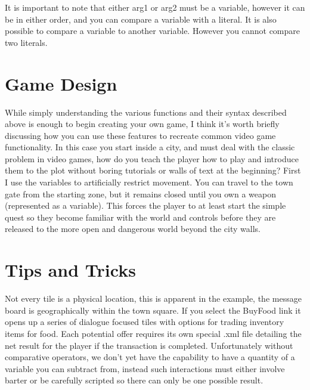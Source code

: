 \documentclass[11pt]{article}
\begin{document}
It is important to note that either arg1 or arg2 must be a variable, however it can be in either order, and you can compare a variable with a literal. It is also possible to compare a variable to another variable. However you cannot compare two literals.


\section{Game Design}

While simply understanding the various functions and their syntax described above is enough to begin creating your own game, I think it's worth briefly discussing how you can use these features to recreate common video game functionality. In this case you start inside a city, and must deal with the classic problem in video games, how do you teach the player how to play and introduce them to the plot without boring tutorials or walls of text at the beginning? First I use the variables to artificially restrict movement. You can travel to the town gate from the starting zone, but it remains closed until you own a weapon (represented as a variable). This forces the player to at least start the simple quest so they become familiar with the world and controls before they are released to the more open and dangerous world beyond the city walls. 

\section{Tips and Tricks}

Not every tile is a physical location, this is apparent in the example, the message board is geographically within the town square. If you select the BuyFood link it opens up a series of dialogue focused tiles with options for trading inventory items for food. Each potential offer requires its own special .xml file detailing the net result for the player if the transaction is completed. Unfortunately without comparative operators, we don't yet have the capability to have a quantity of a variable you can subtract from, instead such interactions must either involve barter or be carefully scripted so there can only be one possible result.
\end{document}

